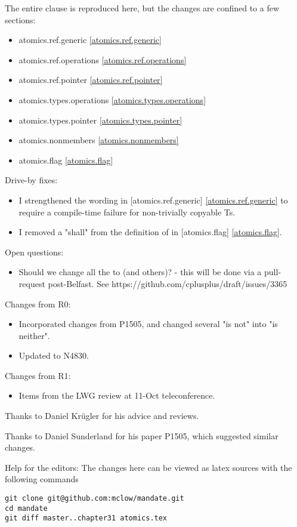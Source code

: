 The entire clause is reproduced here, but the changes are confined to a few sections:

\begin{itemize}
\item{atomics.ref.generic}		\ref{atomics.ref.generic}
\item{atomics.ref.operations}	\ref{atomics.ref.operations}
\item{atomics.ref.pointer}		\ref{atomics.ref.pointer}
\item{atomics.types.operations}	\ref{atomics.types.operations}
\item{atomics.types.pointer}	\ref{atomics.types.pointer}
\item{atomics.nonmembers}		\ref{atomics.nonmembers}
\item{atomics.flag}				\ref{atomics.flag}
\end{itemize}

Drive-by fixes:
\begin{itemize}
\item{I strengthened the wording in [atomics.ref.generic] \ref{atomics.ref.generic} to require a compile-time failure for non-trivially copyable Ts.}
\item{I removed a "shall" from the definition of  in [atomics.flag] \ref{atomics.flag}.}
\end{itemize}

Open questions:
\begin{itemize}
\item{Should we change all the  to  (and others)? - this will be done via a pull-request post-Belfast. See https://github.com/cplusplus/draft/issues/3365}
\end{itemize}


Changes from R0:
\begin{itemize}
\item{Incorporated changes from P1505, and changed several "is not" into "is neither".}
\item{Updated to N4830.}
\end{itemize}

Changes from R1:
\begin{itemize}
\item{Items from the LWG review at 11-Oct teleconference.}
\end{itemize}

Thanks to Daniel Krügler for his advice and reviews.

Thanks to Daniel Sunderland for his paper P1505, which suggested similar changes.

\vfill
Help for the editors: The changes here can be viewed as latex sources with the following commands
\begin{verbatim}
git clone git@github.com:mclow/mandate.git
cd mandate
git diff master..chapter31 atomics.tex
\end{verbatim}
